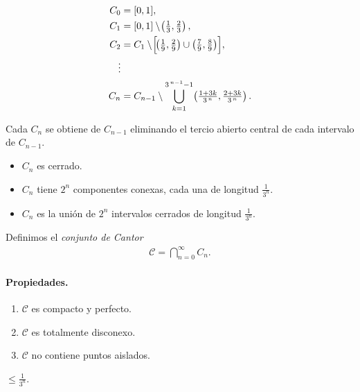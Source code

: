 \begin{align*}
C_0 &= [0,1],\\
C_1 &= [0,1]\setminus\!\left(\tfrac13,\tfrac23\right),\\
C_2 &= C_1\setminus\!\Bigl[\!\left(\tfrac19,\tfrac29\right)\cup\left(\tfrac79,\tfrac89\right)\Bigr],\\
\vdots\\
C_n &= C_{n-1}\setminus\bigcup_{k=1}^{3^{\,n-1}-1}\!
       \left(\tfrac{1+3k}{3^{\,n}},\tfrac{2+3k}{3^{\,n}}\right).
\end{align*}


Cada $C_n$ se obtiene de $C_{n-1}$ eliminando el tercio abierto central de cada intervalo de $C_{n-1}$.
\begin{itemize}
  \item $C_n$ es cerrado.
  \item $C_n$ tiene $2^{n}$ componentes conexas, cada una de longitud $\frac{1}{3^{n}}$.
  \item $C_n$ es la unión de $2^{n}$ intervalos cerrados de longitud $\frac{1}{3^{n}}$.
\end{itemize}

Definimos el \emph{conjunto de Cantor}
\begin{align*}
\mathcal C=\bigcap_{n=0}^{\infty} C_n.
\end{align*}


\paragraph{\textbf{Propiedades.}}
\begin{enumerate}
  \item $\mathcal C$ es compacto y perfecto.
  \item $\mathcal C$ es totalmente disconexo.
  \item $\mathcal C$ no contiene puntos aislados. 
\end{enumerate}
$\le\frac{1}{3^{n}}$.

